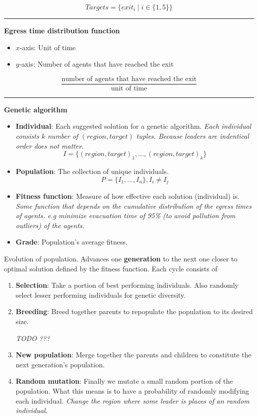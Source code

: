 \[ Targets = \{exit_i ∣ i ∈ \{1, 5\}\}\]

\begin{center}\rule{0.5\linewidth}{\linethickness}\end{center}

\textbf{Egress time distribution function}

\begin{itemize}
\tightlist
\item
  \(x\)-axis: Unit of time
\item
  \(y\)-axis: Number of agents that have reached the exit
\end{itemize}

\[ \frac{\text{number of agents that have reached the exit}}{\text{unit of time}} \]

\begin{center}\rule{0.5\linewidth}{\linethickness}\end{center}

\textbf{Genetic algorithm}

\begin{itemize}
\tightlist
\item
  \textbf{Individual}: Each suggested solution for a genetic algorithm.
  \emph{Each individual consists \(k\) number of \((region, target)\)
  tuples. Because leaders are indentical order does not matter.}
  \[ I = \{(region , target)_1,..., (region , target)_k\}\]
\item
  \textbf{Population}: The collection of unique individuals.
  \[ P = \{I_1, ...,I_n\}, I_i ≠ I_j \]
\item
  \textbf{Fitness function}: Measure of how effective each solution
  (individual) is. \emph{Some function that depends on the cumulative
  distribution of the egress times of agents. e.g minimize evacuation
  time of 95\% (to avoid pollution from outliers) of the agents.}
\item
  \textbf{Grade}: Population's average fitness.
\end{itemize}

Evolution of population. Advances one \textbf{generation} to the next
one closer to optimal solution defined by the fitness function. Each
cycle consists of

\begin{enumerate}
\def\labelenumi{\arabic{enumi})}
\item
  \textbf{Selection}: Take a portion of best performing individuals.
  Also randomly select lesser performing individuals for genetic
  diversity.
\item
  \textbf{Breeding}: Breed together parents to repopulate the population
  to its desired size.

  \emph{TODO ???}
\item
  \textbf{New population}: Merge together the parents and children to
  constitute the next generation's population.
\item
  \textbf{Random mutation}: Finally we mutate a small random portion of
  the population. What this means is to have a probability of randomly
  modifying each individual. \emph{Change the region where some leader
  is places of an random individual.}
\end{enumerate}

